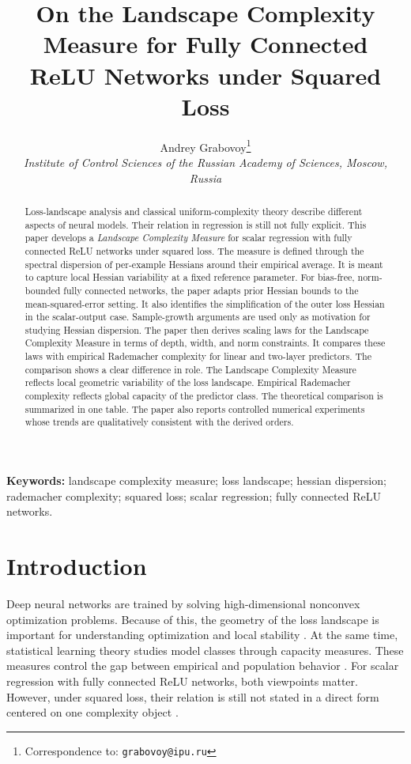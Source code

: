 \documentclass[10pt,letterpaper]{article}
\title{On the Landscape Complexity Measure for Fully Connected ReLU Networks under Squared Loss}
\author{%
  Andrey Grabovoy\thanks{Correspondence to: \texttt{grabovoy@ipu.ru}}\\
  \textit{Institute of Control Sciences of the Russian Academy of Sciences, Moscow, Russia}
}
\date{\vspace{-0.5em}}
\theoremstyle{definition}
\begin{document}
\maketitle

\begin{abstract}
Loss-landscape analysis and classical uniform-complexity theory describe different aspects of neural models. Their relation in regression is still not fully explicit. This paper develops a \emph{Landscape Complexity Measure} for scalar regression with fully connected ReLU networks under squared loss. The measure is defined through the spectral dispersion of per-example Hessians around their empirical average. It is meant to capture local Hessian variability at a fixed reference parameter. For bias-free, norm-bounded fully connected networks, the paper adapts prior Hessian bounds to the mean-squared-error setting. It also identifies the simplification of the outer loss Hessian in the scalar-output case. Sample-growth arguments are used only as motivation for studying Hessian dispersion. The paper then derives scaling laws for the Landscape Complexity Measure in terms of depth, width, and norm constraints. It compares these laws with empirical Rademacher complexity for linear and two-layer predictors. The comparison shows a clear difference in role. The Landscape Complexity Measure reflects local geometric variability of the loss landscape. Empirical Rademacher complexity reflects global capacity of the predictor class. The theoretical comparison is summarized in one table. The paper also reports controlled numerical experiments whose trends are qualitatively consistent with the derived orders.
\end{abstract}

\noindent\textbf{Keywords:} landscape complexity measure; loss landscape; hessian dispersion; rademacher complexity; squared loss; scalar regression; fully connected ReLU networks.

\section{Introduction}

Deep neural networks are trained by solving high-dimensional nonconvex optimization problems. Because of this, the geometry of the loss landscape is important for understanding optimization and local stability \cite{fort2019emergent,ghorbani2019,sagun2018}.
At the same time, statistical learning theory studies model classes through capacity measures. These measures control the gap between empirical and population behavior \cite{bartlett2002,vapnik1998}.
For scalar regression with fully connected ReLU networks, both viewpoints matter. However, under squared loss, their relation is still not stated in a direct form centered on one complexity object \cite{bartlett2002,vapnik1998,kiselev2024hessian}.
\end{document}
